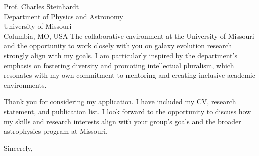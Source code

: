 \documentclass[11pt]{letter}
\begin{document}
\begin{letter}{Prof. Charles Steinhardt \\ Department of Physics and Astronomy \\ University of Missouri \\ Columbia, MO, USA}
The collaborative environment at the University of Missouri and the opportunity to work closely with you on galaxy evolution research strongly align with my goals. I am particularly inspired by the department’s emphasis on fostering diversity and promoting intellectual pluralism, which resonates with my own commitment to mentoring and creating inclusive academic environments.

Thank you for considering my application. I have included my CV, research statement, and publication list. I look forward to the opportunity to discuss how my skills and research interests align with your group's goals and the broader astrophysics program at Missouri.

\closing{Sincerely,}

\end{letter}
\end{document}
